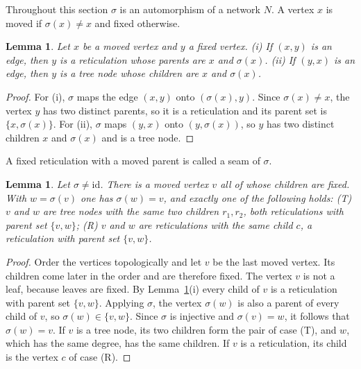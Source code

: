 \documentclass[11pt,a4paper]{article}
\newtheorem{lemma}[theorem]{Lemma}
\theoremstyle{definition}
\begin{document}
Throughout this section $\sigma$ is an automorphism of a network $N$. A vertex $x$ is moved if $\sigma(x)\neq x$ and fixed otherwise.

\begin{lemma}\label{lem:seams}
Let $x$ be a moved vertex and $y$ a fixed vertex.
(i) If $(x,y)$ is an edge, then $y$ is a reticulation whose parents are $x$ and $\sigma(x)$.
(ii) If $(y,x)$ is an edge, then $y$ is a tree node whose children are $x$ and $\sigma(x)$.
\end{lemma}

\begin{proof}
For (i), $\sigma$ maps the edge $(x,y)$ onto $(\sigma(x),y)$. Since $\sigma(x)\neq x$, the vertex $y$ has two distinct parents, so it is a reticulation and its parent set is $\{x,\sigma(x)\}$. For (ii), $\sigma$ maps $(y,x)$ onto $(y,\sigma(x))$, so $y$ has two distinct children $x$ and $\sigma(x)$ and is a tree node.
\end{proof}

A fixed reticulation with a moved parent is called a seam of $\sigma$.

\begin{lemma}\label{lem:seed}
Let $\sigma\neq\mathrm{id}$. There is a moved vertex $v$ all of whose children are fixed. With $w=\sigma(v)$ one has $\sigma(w)=v$, and exactly one of the following holds:
(T) $v$ and $w$ are tree nodes with the same two children $r_1,r_2$, both reticulations with parent set $\{v,w\}$;
(R) $v$ and $w$ are reticulations with the same child $c$, a reticulation with parent set $\{v,w\}$.
\end{lemma}

\begin{proof}
Order the vertices topologically and let $v$ be the last moved vertex. Its children come later in the order and are therefore fixed. The vertex $v$ is not a leaf, because leaves are fixed. By Lemma~\ref{lem:seams}(i) every child of $v$ is a reticulation with parent set $\{v,w\}$. Applying $\sigma$, the vertex $\sigma(w)$ is also a parent of every child of $v$, so $\sigma(w)\in\{v,w\}$. Since $\sigma$ is injective and $\sigma(v)=w$, it follows that $\sigma(w)=v$. If $v$ is a tree node, its two children form the pair of case (T), and $w$, which has the same degree, has the same children. If $v$ is a reticulation, its child is the vertex $c$ of case (R).
\end{proof}
\end{document}
